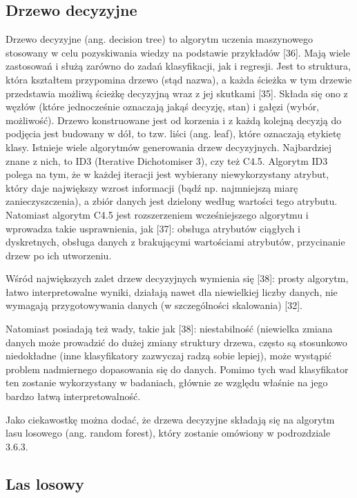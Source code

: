 \subsection{Drzewo decyzyjne}
\label{cha:Drzewo decyzyjne}

Drzewo decyzyjne (ang. decision tree) to algorytm uczenia maszynowego stosowany w celu pozyskiwania wiedzy na podstawie przykładów [36]. Mają wiele zastosowań i służą zarówno do zadań klasyfikacji, jak i regresji. Jest to struktura, która kształtem przypomina drzewo (stąd nazwa), a każda ścieżka w tym drzewie przedstawia możliwą ścieżkę decyzyjną wraz z jej skutkami [35]. Składa się ono z węzłów (które jednocześnie oznaczają jakąś decyzję, stan) i gałęzi (wybór, możliwość). Drzewo konstruowane jest od korzenia i z każdą kolejną decyzją do podjęcia jest budowany w dół, to tzw. liści (ang. leaf), które oznaczają etykietę klasy. Istnieje wiele algorytmów generowania drzew decyzyjnych. Najbardziej znane z nich, to ID3 (Iterative Dichotomiser 3), czy też C4.5. Algorytm ID3 polega na tym, że w każdej iteracji jest wybierany niewykorzystany atrybut, który daje największy wzrost informacji (bądź np. najmniejszą miarę zanieczyszczenia), a zbiór danych jest dzielony według wartości tego atrybutu. Natomiast algorytm C4.5 jest rozszerzeniem wcześniejszego algorytmu i wprowadza takie usprawnienia, jak [37]:
obsługa atrybutów ciągłych i dyskretnych,
obsługa danych z brakującymi wartościami atrybutów,
przycinanie drzew po ich utworzeniu.

Wśród największych zalet drzew decyzyjnych wymienia się [38]:
prosty algorytm,
łatwo interpretowalne wyniki,
działają nawet dla niewielkiej liczby danych,
nie wymagają przygotowywania danych (w szczególności skalowania) [32].

Natomiast posiadają też wady, takie jak [38]:
niestabilność (niewielka zmiana danych może prowadzić do dużej zmiany struktury drzewa,
często są stosunkowo niedokładne (inne klasyfikatory zazwyczaj radzą sobie lepiej),
może wystąpić problem nadmiernego dopasowania się do danych.
Pomimo tych wad klasyfikator ten zostanie wykorzystany w badaniach, głównie ze względu właśnie na jego bardzo łatwą interpretowalność.

Jako ciekawostkę można dodać, że drzewa decyzyjne składają się na algorytm lasu losowego (ang. random forest), który zostanie omówiony w podrozdziale 3.6.3. 

\subsection{Las losowy}
\label{cha:Las losowy}

